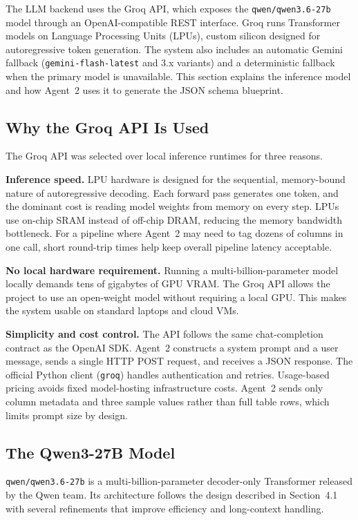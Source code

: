 \documentclass[12pt,a4paper,openany]{report}
\begin{document}
The LLM backend uses the Groq API, which exposes the \texttt{qwen/qwen3.6-27b} model through an OpenAI-compatible REST interface. Groq runs Transformer models on Language Processing Units (LPUs), custom silicon designed for autoregressive token generation. The system also includes an automatic Gemini fallback (\texttt{gemini-flash-latest} and 3.x variants) and a deterministic fallback when the primary model is unavailable. This section explains the inference model and how Agent~2 uses it to generate the JSON schema blueprint.

\subsection{Why the Groq API Is Used}
The Groq API was selected over local inference runtimes for three reasons.

\textbf{Inference speed.} LPU hardware is designed for the sequential, memory-bound nature of autoregressive decoding. Each forward pass generates one token, and the dominant cost is reading model weights from memory on every step. LPUs use on-chip SRAM instead of off-chip DRAM, reducing the memory bandwidth bottleneck. For a pipeline where Agent~2 may need to tag dozens of columns in one call, short round-trip times help keep overall pipeline latency acceptable.

\textbf{No local hardware requirement.} Running a multi-billion-parameter model locally demands tens of gigabytes of GPU VRAM. The Groq API allows the project to use an open-weight model without requiring a local GPU. This makes the system usable on standard laptops and cloud VMs.

\textbf{Simplicity and cost control.} The API follows the same chat-completion contract as the OpenAI SDK. Agent~2 constructs a system prompt and a user message, sends a single HTTP POST request, and receives a JSON response. The official Python client (\texttt{groq}) handles authentication and retries. Usage-based pricing avoids fixed model-hosting infrastructure costs. Agent~2 sends only column metadata and three sample values rather than full table rows, which limits prompt size by design.

\subsection{The Qwen3-27B Model}
\texttt{qwen/qwen3.6-27b} is a multi-billion-parameter decoder-only Transformer released by the Qwen team. Its architecture follows the design described in Section~4.1 with several refinements that improve efficiency and long-context handling.
\end{document}
